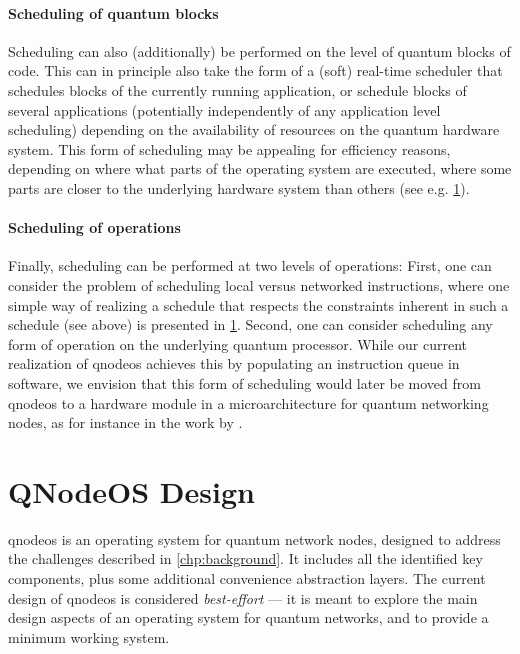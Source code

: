 \paragraph{Scheduling of quantum blocks}

Scheduling can also (additionally) be performed on the level of quantum blocks of code. This can in
principle also take the form of a (soft) real-time scheduler that schedules blocks of the currently
running application, or schedule blocks of several applications (potentially independently of any
application level scheduling) depending on the availability of resources on the quantum hardware
system. This form of scheduling may be appealing for efficiency reasons, depending on where what
parts of the operating system are executed, where some parts are closer to the underlying hardware
system than others (see e.g. \cref{sec:arch:design}).

\paragraph{Scheduling of operations}

Finally, scheduling can be performed at two levels of operations: First, one can consider the
problem of scheduling local versus networked instructions, where one simple way of realizing a
schedule that respects the constraints inherent in such a schedule (see above) is presented in
\cref{sec:arch:design}. Second, one can consider scheduling any form of operation on the underlying
quantum processor. While our current realization of \acrshort{qnodeos} achieves this by populating
an instruction queue in software, we envision that this form of scheduling would later be moved from
\acrshort{qnodeos} to a hardware module in a microarchitecture for quantum networking nodes, as for
instance in the work by \textcite{fu_2017_microarch}.

\section{QNodeOS Design}
\label{sec:arch:design}

\acrshort{qnodeos} is an operating system for quantum network nodes, designed to address the
challenges described in \cref{chp:background}. It includes all the identified key components, plus
some additional convenience abstraction layers. The current design of \acrshort{qnodeos} is
considered \emph{best-effort} --- it is meant to explore the main design aspects of an operating
system for quantum networks, and to provide a minimum working system.

